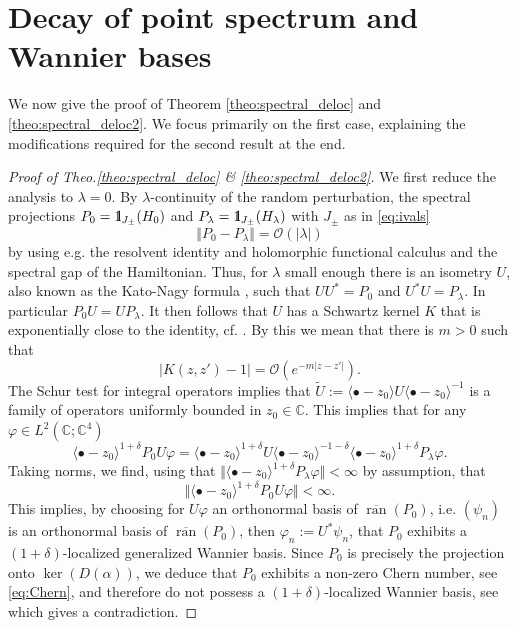\documentclass[reqno,12pt,letterpaper]{amsart}
\newcommand{\CC}{{\mathbb C}}
\numberwithin{equation}{section}
\def\indic{\operatorname{1\hskip-2.75pt\relax l}}
\begin{document}
\section{Decay of point spectrum and Wannier bases}
\label{sec:spec_deloc}
We now give the proof of Theorem \ref{theo:spectral_deloc} and \ref{theo:spectral_deloc2}. We focus primarily on the first case, explaining the modifications required for the second result at the end. 
\begin{proof}[Proof of Theo.\ref{theo:spectral_deloc} \& \ref{theo:spectral_deloc2}]
We first reduce the analysis to $\lambda=0.$ By $\lambda$-continuity of the random perturbation, the spectral projections $P_0 = \indic_{J_{\pm}}(H_0)$ and $P_{\lambda} = \indic_{J_{\pm}}(H_{\lambda})$ with $J_{\pm}$ as in \eqref{eq:ivals} 
\[ \Vert P_0 - P_{\lambda} \Vert = \mathcal O(\vert \lambda \vert)\]
by using e.g. the resolvent identity and holomorphic functional calculus and the spectral gap of the Hamiltonian. 
Thus, for $\lambda$ small enough there is an isometry \cite[Lemma $10$]{BES94} \cite[Theo.6.32]{Kato} $U$, also known as the Kato-Nagy formula \cite{Ka55,SN47}, such that $UU^* = P_0$ and $U^*U=P_{\lambda}.$ In particular $P_{0}U = U P_{\lambda}.$ It then follows that $U$ has a Schwartz kernel $K$ that is exponentially close to the identity, cf. \cite[Lemma $8.5$]{CMM19}.
By this we mean that there is $m>0$ such that
\[ \vert K(z,z')-1\vert  = \mathcal O(e^{-m \vert z-z'\vert}).\]
The Schur test for integral operators implies that $\tilde U:=\langle \bullet-z_0 \rangle U  \langle \bullet-z_0 \rangle^{-1}$ is a family of operators uniformly bounded in $z_0 \in \CC$. 
This implies that for any $\varphi \in L^2(\CC;\CC^4)$ 
$$ \langle \bullet-z_0 \rangle^{1+\delta} P_{0} U\varphi = \langle \bullet-z_0 \rangle^{1+\delta} U \langle \bullet-z_0 \rangle^{-1-\delta} \langle \bullet-z_0 \rangle^{1+\delta} P_{\lambda}\varphi.$$
Taking norms, we find, using that $\Vert \langle \bullet-z_0 \rangle^{1+\delta} P_{\lambda}\varphi\Vert < \infty$ by assumption, that
\[ \Vert \langle \bullet-z_0 \rangle^{1+\delta}  P_{0} U\varphi \Vert  < \infty.\]
This implies, by choosing for $U\varphi$ an orthonormal basis of $\overline{\operatorname{ran}}(P_0)$, i.e. $(\psi_n)$ is an orthonormal basis of $\overline{\operatorname{ran}}(P_0)$, then $\varphi_n:=U^*\psi_n$, that $P_0 $ exhibits a $(1+\delta)$-localized generalized Wannier basis. Since $P_0$ is precisely the projection onto $\ker(D(\alpha))$, we deduce that $P_0$ exhibits a non-zero Chern number, see \eqref{eq:Chern}, and therefore do not possess a $(1+\delta)$-localized Wannier basis, see \cite{LS21} which gives a contradiction.


\end{proof}
\end{document}
